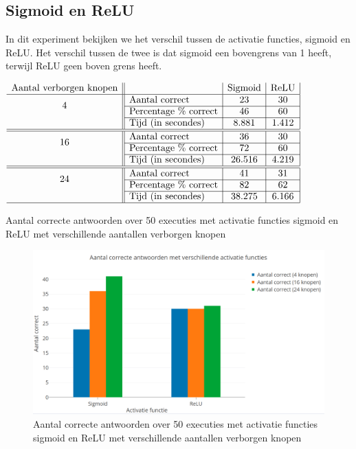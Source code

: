 \subsection{Sigmoid en ReLU}
In dit experiment bekijken we het verschil tussen de activatie functies, sigmoid en ReLU. Het verschil tussen de twee is dat sigmoid een bovengrens van 1 heeft, terwijl ReLU geen boven grens heeft.

\begin{table}[ht]
    \centering
      $\begin{array}{ c || l | c  | c | c}
   \text{Aantal verborgen knopen} & & \text{Sigmoid} & \text{ReLU} \\ \hline
     \multirow{2}{*}{4}  &    \text{Aantal correct}       & 23 & 30 \\ \cline{2-4}
     &   \text{Percentage \% correct} & 46 & 60 \\ \cline{2-4}
     &   \text{Tijd (in secondes)}   & 8.881 & 1.412 \\ \hline \hline 
     \multirow{2}{*}{16} &   \text{Aantal correct}       & 36 & 30 \\ \cline{2-4}
     &   \text{Percentage \% correct} & 72 & 60 \\ \cline{2-4}
     &   \text{Tijd (in secondes)} & 26.516 & 4.219\\ \hline \hline
      \multirow{2}{*}{24} &   \text{Aantal correct}       & 41 & 31\\ \cline{2-4}
     &   \text{Percentage \% correct} & 82 & 62\\ \cline{2-4}
     &   \text{Tijd (in secondes)}  & 38.275 & 6.166\\ \hline
      \end{array}$
    \caption{Aantal correcte antwoorden over 50 executies met activatie functies sigmoid en ReLU met verschillende aantallen verborgen knopen}
    \label{tab:relu}
\end{table}
\begin{figure}[ht!]
    \centering
    \includegraphics[scale=0.3]{graphs/g.png}
    \caption{Aantal correcte antwoorden over 50 executies met activatie functies sigmoid en ReLU met verschillende aantallen verborgen knopen}
    \label{fig:relu}
\end{figure}

